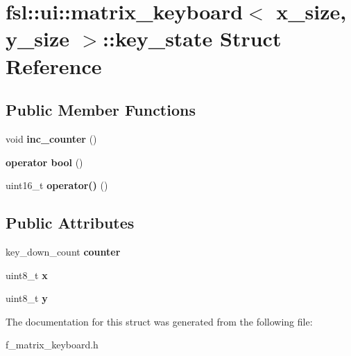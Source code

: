 \hypertarget{structfsl_1_1ui_1_1matrix__keyboard_1_1key__state}{}\section{fsl\+::ui\+::matrix\+\_\+keyboard$<$ x\+\_\+size, y\+\_\+size $>$\+::key\+\_\+state Struct Reference}
\label{structfsl_1_1ui_1_1matrix__keyboard_1_1key__state}
\subsection*{Public Member Functions}
\begin{DoxyCompactItemize}
\item 
\mbox{\label{structfsl_1_1ui_1_1matrix__keyboard_1_1key__state_abf8c10943a20197e07a5ff96654d244a}} 
void {\bfseries inc\+\_\+counter} ()
\item 
\mbox{\label{structfsl_1_1ui_1_1matrix__keyboard_1_1key__state_a18893f804007b00f1332509be92cdc88}} 
{\bfseries operator bool} ()
\item 
\mbox{\label{structfsl_1_1ui_1_1matrix__keyboard_1_1key__state_a8d68bb68e79341cf74503b15310881e1}} 
uint16\+\_\+t {\bfseries operator()} ()
\end{DoxyCompactItemize}
\subsection*{Public Attributes}
\begin{DoxyCompactItemize}
\item 
\mbox{\label{structfsl_1_1ui_1_1matrix__keyboard_1_1key__state_acb70751b16b85aa36f0fcfcba9766724}} 
key\+\_\+down\+\_\+count {\bfseries counter}
\item 
\mbox{\label{structfsl_1_1ui_1_1matrix__keyboard_1_1key__state_abf7cd5d661e8468dd1134d12545c0baa}} 
uint8\+\_\+t {\bfseries x}
\item 
\mbox{\label{structfsl_1_1ui_1_1matrix__keyboard_1_1key__state_acab77ca4b9ebbd03fa873a73c526eb73}} 
uint8\+\_\+t {\bfseries y}
\end{DoxyCompactItemize}


The documentation for this struct was generated from the following file\+:\begin{DoxyCompactItemize}
\item 
f\+\_\+matrix\+\_\+keyboard.\+h\end{DoxyCompactItemize}

